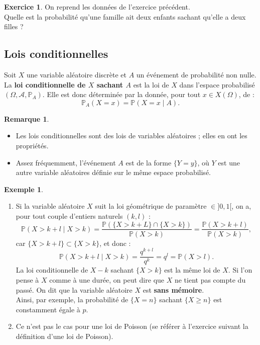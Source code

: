 \documentclass[french]{article}
\renewcommand{\P}{\mathbb{P}}
\theoremstyle{plain}
\theoremstyle{definition}
\newtheorem*{ex}{Exemple}
\newtheorem{exo}{Exercice}
\newtheorem*{rmq}{Remarque}
\theoremstyle{remark}
\begin{document}
\begin{exo}
	On reprend les données de l'exercice précédent.\\
	Quelle est la probabilité qu'une famille ait deux enfants sachant qu'elle a deux filles ?
\end{exo}

\subsection{Lois conditionnelles}

\begin{dfn}
	Soit $X$ une variable aléatoire discrète et $A$ un événement de probabilité non nulle.\\
	La \textbf{loi conditionnelle de $X$ sachant $A$} est la loi de $X$ dans l'espace probabilisé $(\Omega,\mathcal{A},\P_A)$. Elle est donc déterminée par la donnée, pour tout $x\in X(\Omega)$, de :
	$$\P_A(X=x)=\P(X=x\mid A).$$
\end{dfn}

\begin{rmq}
	\begin{itemize}
		\item Les lois conditionnelles sont des lois de variables aléatoires ; elles en ont les propriétés.
		\item Assez fréquemment, l'événement $A$ est de la forme $\{Y=y\}$, où $Y$ est une autre variable aléatoires définie sur le même espace probabilisé.
	\end{itemize}
\end{rmq}

\begin{ex}
	\begin{enumerate}
		\item Si la variable aléatoire $X$ suit la loi géométrique de paramètre $\in]0,1[$, on a, pour tout couple d'entiers naturels $(k,l)$ : $$\P(X>k+l\mid X>k)=\frac{\P(\{X>k+L\}\cap\{X>k\})}{\P(X>k)}=\frac{\P(X>k+l)}{\P(X>k)},$$ car $\{X>k+l\}\subset\{X>k\}$, et donc : $$\P(X>k+l\mid X>k)=\frac{q^{k+l}}{q^k}=q^l=\P(X>l).$$ La loi conditionnelle de $X-k$ sachant $\{X>k\}$ est la même loi de $X$. Si l'on pense à $X$ comme à une durée, on peut dire que $X$ ne tient pas compte du passé. On dit que la variable aléatoire $X$ est \textbf{sans mémoire}.\\
		Ainsi, par exemple, la probabilité de $\{X=n\}$ sachant $\{X\geqslant n\}$ est constamment égale à $p$.
		\item Ce n'est pas le cas pour une loi de Poisson (se référer à l'exercice suivant la définition d'une loi de Poisson).
	\end{enumerate}
\end{ex}
\end{document}
